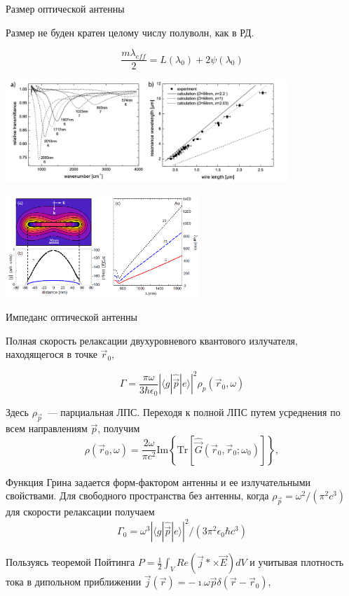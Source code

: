 \documentclass[9pt, compress, xcolor=table]{beamer}
\begin{document}
\begin{frame}{Размер оптической антенны}

Размер не буден кратен целому числу полуволн, как в РД.

\begin{equation*}
\boxed{\frac{m\lambda_{eff}}{2} = L(\lambda_{0})+2\psi(\lambda_0)}
\end{equation*}

\begin{center}
\includegraphics[width=0.8\textwidth]{optant60}

\includegraphics[width=0.55\textwidth]{optant_7}
\end{center}
\end{frame}

\begin{frame}{Импеданс оптической антенны}

Полная скорость релаксации двухуровневого квантового излучателя, находящегося в точке
$\vec r_0$,

\begin{equation*}
\Gamma=\frac{\pi \omega}{3\hbar \epsilon_0}\left|\langle g| \hat{\vec p}| e \rangle\right|^2\rho_{p}(\vec r_0, \omega)
\end{equation*}

Здесь $\rho_{\vec p}$~--- парциальная ЛПС. Переходя к полной ЛПС путем усреднения по
всем направлениям $\vec p$, получим
\begin{equation*}
\rho (\vec r_0, \omega) =\frac{2 \omega}{\pi c^2}\text{Im}\left\{\text{Tr}\left[\hat{\vec
G}(\vec  r_0,\vec r_0;\omega_0)\right]\right\},
\end{equation*}

Функция Грина задается форм-фактором антенны и ее излучательными свойствами. Для
свободного пространства без антенны, когда $\rho_{\vec p} = \omega^2/(\pi^2 c^3)$ для скорости релаксации получаем
\begin{equation*}
\Gamma_0=\omega^3\left|\langle g|\hat{\vec p}|e\rangle\right|^2/(3\pi^2
\epsilon_0 \hbar c^3)
\end{equation*}

Пользуясь теоремой Пойтинга $P = \frac{1}{2} \int_V Re(\vec j* \times \vec E)dV$ и
учитывая плотность тока в дипольном приближении $\vec j (\vec r) = - \imath \omega \vec p \delta(\vec r - \vec r_0)$,
\end{frame}
\end{document}

